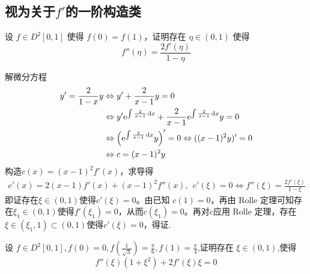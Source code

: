 \subsection{\texorpdfstring{视为关于$f'$的一阶构造类}{视为关于f'的一阶构造类}}
\begin{example}[$f''(\eta) = \frac{2f'(\eta)}{1 - \eta}$]
设 $f \in D^2[0,1]$ 使得 $f(0) = f(1)$，证明存在 $\eta \in (0,1)$ 使得
\[f''(\eta) = \frac{2f'(\eta)}{1 - \eta}\]
\end{example}
\begin{solution}
解微分方程
\begin{align*}
y'=\frac{2}{1-x}y&\Leftrightarrow y'+\frac{2}{x-1}y=0\\
&\Leftrightarrow y'\mathrm{e}^{\int\frac{2}{x-1}\mathop{}\!\mathrm{d} x}+\frac{2}{x-1}\mathrm{e}^{\int\frac{2}{x-1}\mathop{}\!\mathrm{d} x}y=0\\
&\Leftrightarrow\left(\mathrm{e}^{\int\frac{2}{x-1}\mathop{}\!\mathrm{d} x}y\right)'=0\Leftrightarrow ((x-1)^2y)'=0\\
&\Leftrightarrow c=(x-1)^2y
\end{align*}
构造$c(x)=(x-1)^2f'(x)$，求导得
\begin{align*}
    c'(x)=2(x-1)f'(x)+(x-1)^2f''(x),~~c'(\xi)=0\Leftrightarrow f''(\xi)=\frac{2f'(\xi)}{1-\xi}
\end{align*}
即证存在$\xi\in(0,1)$使得$c'(\xi)=0$。由已知 $c(1)=0$，再由 Rolle 定理可知存在$\xi_1\in(0,1)$使得$f'(\xi_1)=0$，从而$c(\xi_1)=0$。再对$c$应用 Rolle 定理，存在$\xi\in(\xi_1,1)\subset(0,1)$使得$c'(\xi)=0$，得证.
\end{solution}
\begin{example}[$f''\left(\xi\right)\left(1+\xi^2\right)+2f'\left(\xi\right)\xi=0$]
    设 $f\in D^2\left[0,1\right],f\left(0\right)=0,f\left(\frac{1}{\sqrt{3}}\right)=\frac{\pi}{6},f\left(1\right)=\frac{\pi}{4}$,证明存在 $\xi\in(0,1)$,使得
\[f''\left(\xi\right)\left(1+\xi^2\right)+2f'\left(\xi\right)\xi=0\]
\end{example}

